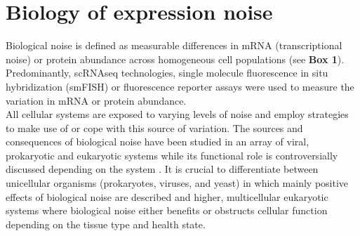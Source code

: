 
\section{Biology of expression noise} 

Biological noise is defined as measurable differences in mRNA (transcriptional noise) or protein abundance across homogeneous cell populations (see \textbf{Box 1}).  Predominantly, scRNAseq technologies, single molecule fluorescence in situ hybridization (smFISH) or fluorescence reporter assays were used to measure the variation in mRNA or protein abundance. \\
All cellular systems are exposed to varying levels of noise and employ strategies to make use of or cope with this source of variation. The sources and consequences of biological noise have been studied in an array of viral, prokaryotic and eukaryotic systems while its functional role is controversially discussed depending on the system \citep{Raj2010, Balazsi2011, Eldar2010}. It is crucial to differentiate between unicellular organisms (prokaryotes, viruses, and yeast) in which mainly positive effects of biological noise are described and higher, multicellular eukaryotic systems where biological noise either benefits or obstructs cellular function depending on the tissue type and health state.\\

